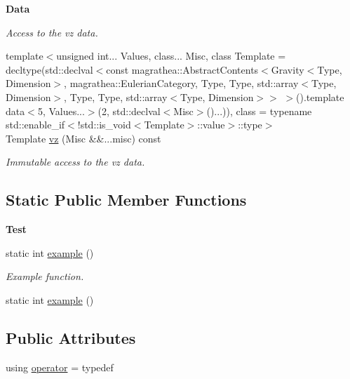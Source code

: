 \begin{Indent}{\bf Data}
\begin{DoxyCompactItemize}
\begin{DoxyCompactList}\small\item\em Access to the vz data. \end{DoxyCompactList}\item 
{\footnotesize template$<$unsigned int... Values, class... Misc, class Template  = decltype(std\-::declval$<$const magrathea\-::\-Abstract\-Contents$<$\-Gravity$<$\-Type, Dimension$>$, magrathea\-::\-Eulerian\-Category, Type, Type, std\-::array$<$\-Type, Dimension$>$, Type, Type, std\-::array$<$\-Type, Dimension$>$$>$ $>$().\-template data$<$5, Values...$>$(2, std\-::declval$<$\-Misc$>$()...)), class  = typename std\-::enable\-\_\-if$<$!std\-::is\-\_\-void$<$\-Template$>$\-::value$>$\-::type$>$ }\\Template \hyperlink{exceptionGravity_a6aac165194a84e37389098fc6b0db201}{vz} (Misc \&\&...misc) const 
\begin{DoxyCompactList}\small\item\em Immutable access to the vz data. \end{DoxyCompactList}\end{DoxyCompactItemize}
\end{Indent}
\subsection*{Static Public Member Functions}
\begin{Indent}{\bf Test}\par
\begin{DoxyCompactItemize}
\item 
static int \hyperlink{exceptionGravity_a143fcf6fc8c3694d5640c2389d069002}{example} ()
\begin{DoxyCompactList}\small\item\em Example function. \end{DoxyCompactList}\item 
static int \hyperlink{exceptionGravity_a728ab297d21cc22fa5c1ae26fe75f284}{example} ()
\end{DoxyCompactItemize}
\end{Indent}
\subsection*{Public Attributes}
\begin{DoxyCompactItemize}
\item 
using \hyperlink{exceptionGravity_a4e52df4c0e4c53d5e34331510c1083d7}{operator} = typedef
\end{DoxyCompactItemize}
